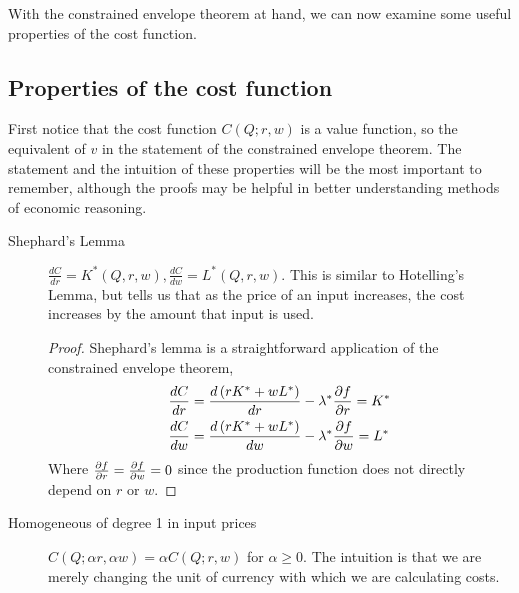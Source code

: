 With the constrained envelope theorem at hand, we can now examine some useful properties of the cost function.

\subsection*{Properties of the cost function}
First notice that the cost function $C(Q; r, w)$ is a value function, so the equivalent of $v$ in the statement of the constrained envelope theorem. The statement and the intuition of these properties will be the most important to remember, although the proofs may be helpful in better understanding methods of economic reasoning.
\begin{description}
    \item[Shephard's Lemma] $\frac{dC}{dr} = K^*(Q, r, w), \frac{dC}{dw} = L^*(Q, r, w)$. This is similar to Hotelling's Lemma, but tells us that as the price of an input increases, the cost increases by the amount that input is used.
    
    \begin{proof}
        Shephard's lemma is a straightforward application of the constrained envelope theorem,
        \begin{align*}
            \frac{dC}{dr} &= \frac{d\left(rK^* + wL^*\right)}{dr} - \lambda^* \frac{\partial f}{\partial r} = K^* \\
            \frac{dC}{dw} &= \frac{d\left(rK^* + wL^*\right)}{dw} - \lambda^* \frac{\partial f}{\partial w} = L^*
        \end{align*}
        Where $\frac{\partial f}{\partial r} = \frac{\partial f}{\partial w} = 0$ since the production function does not directly depend on $r$ or $w$.
    \end{proof} 
    \item[Homogeneous of degree 1 in input prices] $C(Q; \alpha r, \alpha w) = \alpha C(Q; r, w)$ for $\alpha \geq 0$. The intuition is that we are merely changing the unit of currency with which we are calculating costs. 
    

\end{description}

